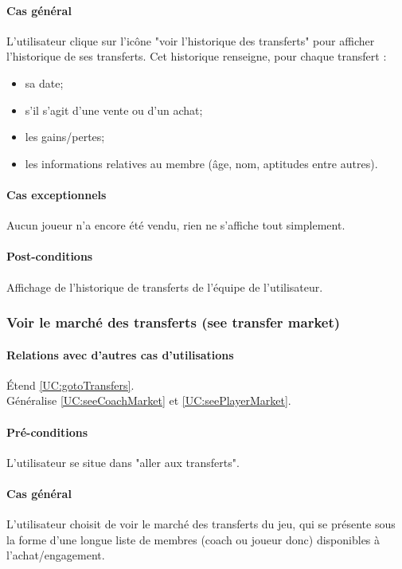\paragraph{Cas général}
L'utilisateur clique sur l'icône "voir l'historique des transferts" pour afficher l'historique de ses transferts. Cet historique renseigne, pour chaque transfert :
\begin{itemize}
\item{sa date;}
\item{s'il s'agit d'une vente ou d'un achat;}
\item{les gains/pertes;}
\item{les informations relatives au membre (âge, nom, aptitudes entre autres).}
\end{itemize}
\paragraph{Cas exceptionnels}
Aucun joueur n'a encore été vendu, rien ne s'affiche tout simplement. 
\paragraph{Post-conditions}
\begin{list}{}{\leftmargin=1.5em}
\item{Affichage de l'historique de transferts de l'équipe de l'utilisateur.}
\end{list}

\subsubsection{Voir le marché des transferts (see transfer market)}
\label{UC:seeMarket}
\paragraph{Relations avec d'autres cas d'utilisations}
Étend \ref{UC:gotoTransfers}.\\
Généralise \ref{UC:seeCoachMarket} et \ref{UC:seePlayerMarket}.
\paragraph{Pré-conditions}
\begin{list}{}{\leftmargin=1.5em}
\item{L'utilisateur se situe dans "aller aux transferts"}.
\end{list}
\paragraph{Cas général}
L'utilisateur choisit de voir le marché des transferts du jeu, qui se présente sous la forme d'une longue liste de membres (coach ou joueur donc) disponibles à l'achat/engagement.
